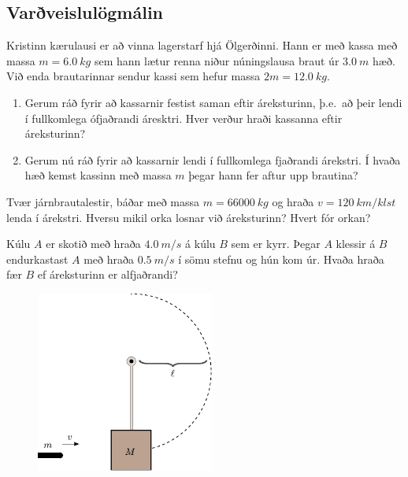 \ifdefined \wholebook \else\documentclass[oneside]{book}\usepackage{EdlBook}\graphicspath{{figures/}}
\begin{document}
\begin{enumerate}[label = \textbf{Dæmi \thechapter.\arabic*.}]
\begin{minipage}{\linewidth}
\subsection*{Varðveislulögmálin}

\item Kristinn kærulausi er að vinna lagerstarf hjá Ölgerðinni. Hann er með kassa með massa $m = \SI{6.0}{kg}$ sem hann lætur renna niður núningslausa braut úr $\SI{3.0}{m}$ hæð. Við enda brautarinnar sendur kassi sem hefur massa $2m = \SI{12.0}{kg}$.

\end{minipage}

\begin{enumerate}[label = \textbf{(\alph*)}]
    \item Gerum ráð fyrir að kassarnir festist saman eftir áreksturinn, þ.e.~að þeir lendi í fullkomlega ófjaðrandi áresktri. Hver verður hraði kassanna eftir áreksturinn?
    \item Gerum nú ráð fyrir að kassarnir lendi í fullkomlega fjaðrandi árekstri. Í hvaða hæð kemst kassinn með massa $m$ þegar hann fer aftur upp brautina?
\end{enumerate}

\item Tvær járnbrautalestir, báðar með massa $m = \SI{66000}{kg}$ og hraða $v = \SI{120}{km/klst}$ lenda í árekstri. Hversu mikil orka losnar við áreksturinn? Hvert fór orkan?

\item Kúlu $A$ er skotið með hraða $\SI{4.0}{m/s}$ á kúlu $B$ sem er kyrr. Þegar $A$ klessir á $B$ endurkastast $A$ með hraða $\SI{0,5}{m/s}$ í sömu stefnu og hún kom úr. Hvaða hraða fær $B$ ef áreksturinn er alfjaðrandi?

\vspace{0.5cm}


\begin{minipage}{\linewidth}
\begin{figure}
\centering
\vspace{-0.5cm}
\includegraphics[width=2.3in]{figures/pendullkula2.pdf}
   \label{fig:pendulkula}
\end{figure}


\end{minipage}
\end{enumerate}
\end{document}
